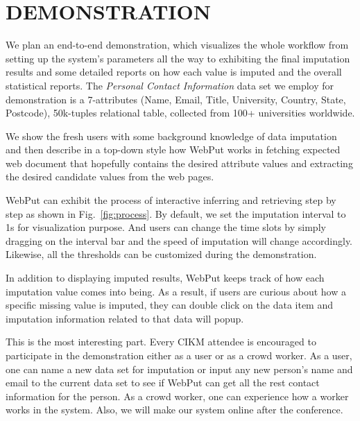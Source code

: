\documentclass[sigconf]{acmart}
\begin{document}
\vspace{-10pt}
\section{DEMONSTRATION}

We plan an end-to-end demonstration, which visualizes the whole workflow from setting up the system's parameters all the way to exhibiting the final imputation results and some detailed reports on how each value is imputed and the overall statistical reports.
%
The {\em Personal Contact Information} data set we employ for demonstration is a 7-attributes (Name, Email, Title, University, Country, State, Postcode), 50k-tuples relational table, collected from 100+ universities worldwide.

We show the fresh users with some background knowledge of data imputation and then describe in a top-down style how WebPut works in fetching expected web document that hopefully contains the desired attribute values and extracting the desired candidate values from the web pages.


WebPut can exhibit the process of interactive inferring and retrieving step by step as shown in Fig.~\ref{fig:process}. By default, we set the imputation interval to 1s for visualization purpose. And users can change the time slots by simply dragging on the interval bar and the speed of imputation will change accordingly. Likewise, all the thresholds can be customized during the demonstration.


 In addition to displaying imputed results, WebPut keeps track of how each imputation value comes into being. As a result, if users are curious about how a specific missing value is imputed, they can double click on the data item and imputation information related to that data will popup. %

This is the most interesting part. Every CIKM attendee is encouraged to participate in the demonstration either as a user or as a crowd worker. As a user, one can name a new data set for imputation or input any new person's name and email to the current data set to see if WebPut can get all the rest contact information for the person. As a crowd worker, one can experience how a worker works in the system.
%
Also, we will make our system online after the conference.



\end{document}
